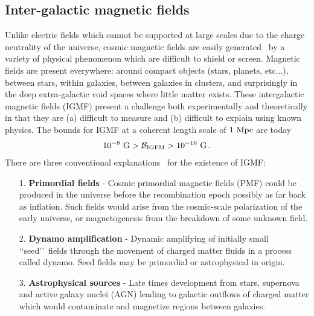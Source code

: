\documentclass[a4paper]{article}
\begin{document}
\subsection{Inter-galactic magnetic fields}\label{sec:IGMF}
\noindent Unlike electric fields which cannot be supported at large scales due to the charge neutrality of the universe, cosmic magnetic fields are easily generated~\cite{kronberg1994extragalactic,gaensler2004origin,durrer2013cosmological} by a variety of physical phenomenon which are difficult to shield or screen. Magnetic fields are present everywhere: around compact objects (stars, planets, etc...), between stars, within galaxies, between galaxies in clusters, and surprisingly in the deep extra-galactic void spaces where little matter exists. These intergalactic magnetic fields (IGMF) present a challenge both experimentally and theoretically in that they are (a) difficult to measure and (b) difficult to explain using known physics. The bounds for IGMF at a coherent length scale of $1{\rm\ Mpc}$ are today~\cite{neronov2010evidence,taylor2011extragalactic,vernstrom2021discovery}
\begin{align}
    10^{-8}{\rm\ G}>\mathcal{B}_{\rm IGFM}>10^{-16}{\rm\ G}\,.
\end{align}
There are three conventional explanations~\cite{batista2021gammaray} for the existence of IGMF:
\begin{itemize}
    \item [1.] \textbf{Primordial fields} - Cosmic primordial magnetic fields (PMF) could be produced in the universe before the recombination epoch possibly as far back as inflation. Such fields would arise from the cosmic-scale polarization of the early universe, or magnetogenesis from the breakdown of some unknown field.
    \item [2.] \textbf{Dynamo amplification} - Dynamic amplifying of initially small \lq\lq seed\rq\rq\ fields through the movement of charged matter fluids in a process called dynamo. Seed fields may be primordial or astrophysical in origin.
    \item [3.] \textbf{Astrophysical sources} - Late times development from stars, supernova and active galaxy nuclei (AGN) leading to galactic outflows of charged matter which would contaminate and magnetize regions between galaxies.
\end{itemize}
\end{document}
